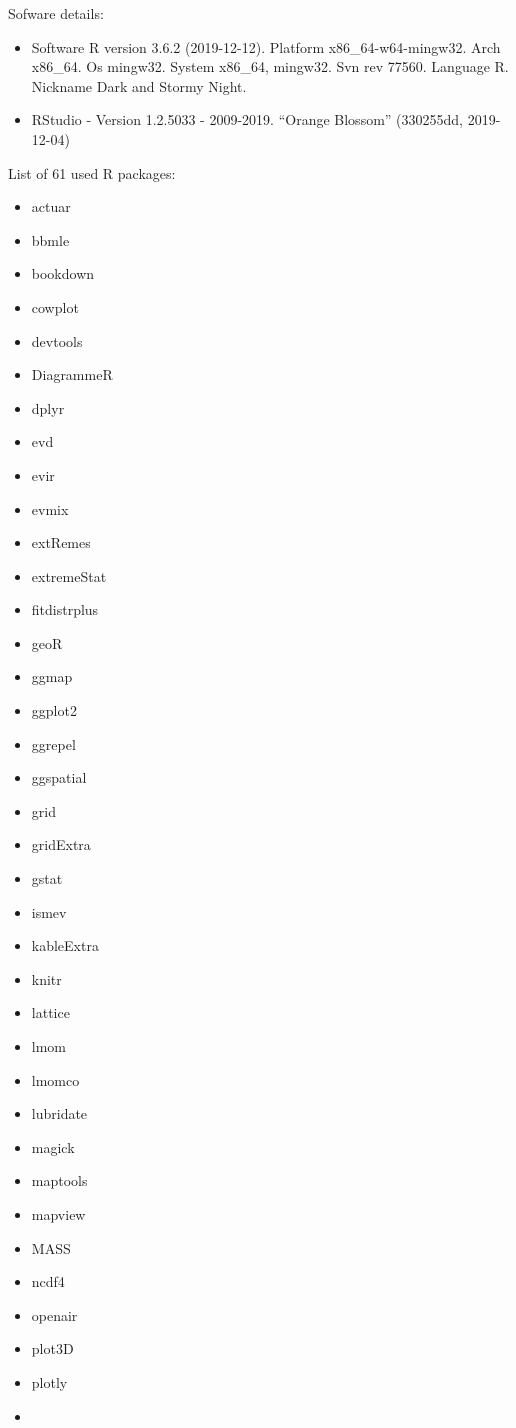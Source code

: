 \documentclass[12pt,oneside]{reedthesis}
\providecommand{\tightlist}{%
  \setlength{\itemsep}{0pt}\setlength{\parskip}{0pt}}
\begin{document}
Sofware details:
\begin{itemize}
\tightlist
\item
  Software R version 3.6.2 (2019-12-12). Platform x86\_64-w64-mingw32. Arch x86\_64. Os mingw32. System x86\_64, mingw32. Svn rev 77560. Language R. Nickname Dark and Stormy Night.
\item
  RStudio - Version 1.2.5033 - 2009-2019. ``Orange Blossom'' (330255dd, 2019-12-04)
\end{itemize}
List of 61 used R packages:
\begin{itemize}
\tightlist
\item
  actuar
\item
  bbmle
\item
  bookdown
\item
  cowplot
\item
  devtools
\item
  DiagrammeR
\item
  dplyr
\item
  evd
\item
  evir
\item
  evmix
\item
  extRemes
\item
  extremeStat
\item
  fitdistrplus
\item
  geoR
\item
  ggmap
\item
  ggplot2
\item
  ggrepel
\item
  ggspatial
\item
  grid
\item
  gridExtra
\item
  gstat
\item
  ismev
\item
  kableExtra
\item
  knitr
\item
  lattice
\item
  lmom
\item
  lmomco
\item
  lubridate
\item
  magick
\item
  maptools
\item
  mapview
\item
  MASS
\item
  ncdf4
\item
  openair
\item
  plot3D
\item
  plotly
\item

\end{itemize}
\end{document}
